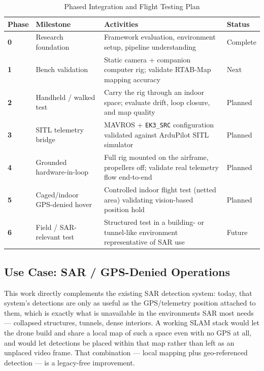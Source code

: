 \documentclass[11pt,a4paper]{article}
\begin{document}
\begin{table}[H]
    \centering
    \small
    \renewcommand{\arraystretch}{1.3}
    \begin{tabularx}{\textwidth}{@{}l p{4.2cm} p{6.8cm} l@{}}
        \toprule
        \textbf{Phase} & \textbf{Milestone} & \textbf{Activities} & \textbf{Status} \\
        \midrule
        \textbf{0} & Research foundation & Framework evaluation, environment setup, pipeline understanding & Complete \\
        \midrule
        \textbf{1} & Bench validation & Static camera + companion computer rig; validate RTAB-Map mapping accuracy & Next \\
        \midrule
        \textbf{2} & Handheld / walked test & Carry the rig through an indoor space; evaluate drift, loop closure, and map quality & Planned \\
        \midrule
        \textbf{3} & SITL telemetry bridge & MAVROS + \texttt{EK3\_SRC} configuration validated against ArduPilot SITL simulator & Planned \\
        \midrule
        \textbf{4} & Grounded hardware-in-loop & Full rig mounted on the airframe, propellers off; validate real telemetry flow end-to-end & Planned \\
        \midrule
        \textbf{5} & Caged/indoor GPS-denied hover & Controlled indoor flight test (netted area) validating vision-based position hold & Planned \\
        \midrule
        \textbf{6} & Field / SAR-relevant test & Structured test in a building- or tunnel-like environment representative of SAR use & Future \\
        \bottomrule
    \end{tabularx}
    \caption{Phased Integration and Flight Testing Plan}
\end{table}

\subsection{Use Case: SAR / GPS-Denied Operations}
This work directly complements the existing SAR detection system: today, that system's detections are only as useful as the GPS/telemetry position attached to them, which is exactly what is unavailable in the environments SAR most needs --- collapsed structures, tunnels, dense interiors. A working SLAM stack would let the drone build and share a local map of such a space even with no GPS at all, and would let detections be placed within that map rather than left as an unplaced video frame. That combination --- local mapping plus geo-referenced detection --- is a legacy-free improvement.
\end{document}
